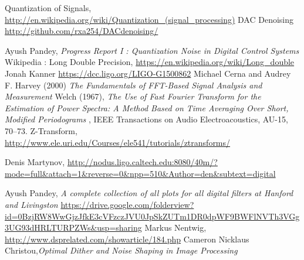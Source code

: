 \documentclass[colorlinks=true,pdfstartview=FitV,linkcolor=blue,
            citecolor=red,urlcolor=magenta]{ligodoc}
\begin{document}
\begin{thebibliography}{100}
 Quantization of Signals, \url{http://en.wikipedia.org/wiki/Quantization_(signal_processing)}
 DAC Denoising \url{http://github.com/rxa254/DACdenoising/}

 Ayush Pandey, \emph{Progress Report I : Quantization Noise in Digital Control Systems} 
 Wikipedia : Long Double Precision, \url{https://en.wikipedia.org/wiki/Long_double}
 Jonah Kanner \url{https://dcc.ligo.org/LIGO-G1500862}
 Michael Cerna and Audrey F. Harvey (2000) \emph{The Fundamentals of FFT-Based Signal Analysis and Measurement}
 Welch (1967),  \emph{The Use of Fast Fourier Transform for the Estimation of Power Spectra: A Method Based on Time Averaging Over Short, Modified Periodograms} , IEEE Transactions on Audio Electroacoustics, AU-15, 70–73.
 Z-Transform, \url{http://www.ele.uri.edu/Courses/ele541/tutorials/ztransforms/}

 Denis Martynov, \url{http://nodus.ligo.caltech.edu:8080/40m/?mode=full&attach=1&reverse=0&npp=510&Author=den&subtext=digital}  



 Ayush Pandey, \emph{A complete collection of all plots for all digital filters at Hanford and Livingston} \url{https://drive.google.com/folderview?id=0BzjRW8WwGjzJfkE3cVFzczJVU0JpSkZUTm1DR0dpWF9BWFlNVTh3VGg3UG93dHRLTURPZWs&usp=sharing}
 Markus Nentwig, \url{http://www.dsprelated.com/showarticle/184.php}
Cameron Nicklaus Christou,\emph{Optimal Dither and Noise Shaping in Image Processing}
\end{thebibliography}      
\printbibliography
\end{document}
